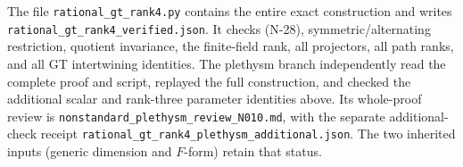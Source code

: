 The file \nolinkurl{rational_gt_rank4.py} contains the entire exact
construction and writes \nolinkurl{rational_gt_rank4_verified.json}.
It checks (N-28), symmetric/alternating restriction, quotient invariance,
the finite-field rank, all projectors, all path ranks, and all GT
intertwining identities.  The plethysm branch independently read the complete proof and script,
replayed the full construction, and checked the additional scalar and
rank-three parameter identities above.  Its whole-proof review is
\nolinkurl{nonstandard_plethysm_review_N010.md}, with the separate
additional-check receipt
\nolinkurl{rational_gt_rank4_plethysm_additional.json}.  The two
inherited inputs (generic dimension and $F$-form) retain that status.
